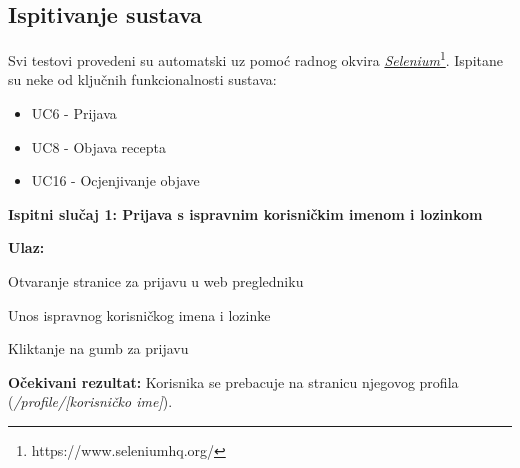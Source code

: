 			\subsection{Ispitivanje sustava}
			
			 
		 	
		 	Svi testovi provedeni su automatski uz pomoć radnog okvira \href{https://www.seleniumhq.org}{\textit{Selenium}\footnote{\url{https://www.seleniumhq.org/}}}. Ispitane su neke od ključnih funkcionalnosti sustava:
		 	\begin{itemize}
		 		\item UC6 - Prijava
		 		\item UC8 - Objava recepta
		 		\item UC16 - Ocjenjivanje objave
		 	\end{itemize}
		 	
		 	\noindent\textbf{Ispitni slučaj 1: Prijava s ispravnim korisničkim imenom i lozinkom}
		 	
			\noindent\textbf{Ulaz:}
			\begin{packed_enum}
				\item Otvaranje stranice za prijavu u web pregledniku
				\item Unos ispravnog korisničkog imena i lozinke
				\item Kliktanje na gumb za prijavu
			\end{packed_enum}
			\textbf{Očekivani rezultat:} Korisnika se prebacuje na stranicu njegovog profila (\textit{/profile/[korisničko ime]}).
			
